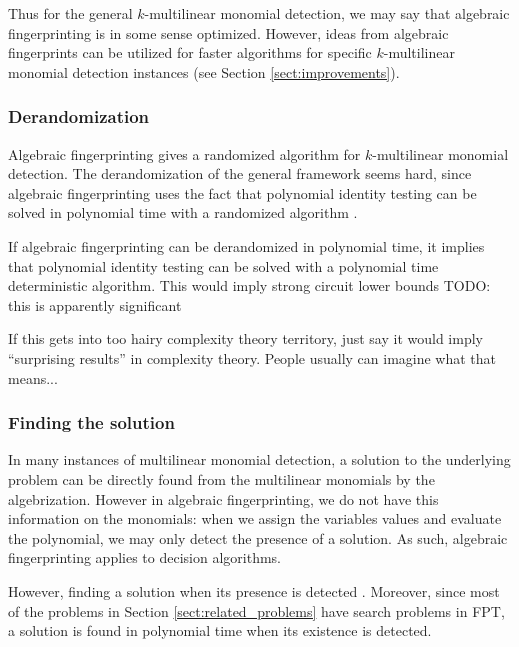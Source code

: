 Thus for the general $k$-multilinear monomial detection, we may say 
that algebraic fingerprinting is in some sense optimized. 
However, 
ideas from algebraic fingerprints can be utilized for faster algorithms for 
specific $k$-multilinear monomial detection instances (see Section \ref{sect:improvements}).

\subsubsection{Derandomization}

Algebraic fingerprinting gives a randomized algorithm for $k$-multilinear monomial detection. 
The derandomization of the general framework seems hard, since algebraic fingerprinting 
uses the fact that polynomial identity testing can be solved in polynomial time with 
a randomized algorithm \cite{Williams09}.

If algebraic fingerprinting can be derandomized 
in polynomial time, it implies that polynomial identity testing can be solved with a 
polynomial time deterministic algorithm. This would imply strong circuit lower bounds 
TODO: this is apparently significant

\begin{anamnote}[nomargin]
  If this gets into too hairy complexity theory territory, just say it would
  imply \enquote{surprising results} in complexity theory.
  People usually can imagine what that means...
\end{anamnote}

\subsubsection{Finding the solution}
\label{sect:finding_the_solution}

In many instances of multilinear monomial detection, 
a solution to the underlying problem can be directly found 
from the multilinear monomials by
 the algebrization. 
However in algebraic fingerprinting, we do not have this information on the monomials: 
when we assign the variables values and evaluate the polynomial, we may only detect the 
presence of a solution. As such, algebraic fingerprinting applies to decision algorithms.

However, finding a solution when its presence is detected
. 
Moreover, since most of the problems in Section \ref{sect:related_problems} 
have search problems in FPT, a solution is found in polynomial time when its 
existence is detected.

